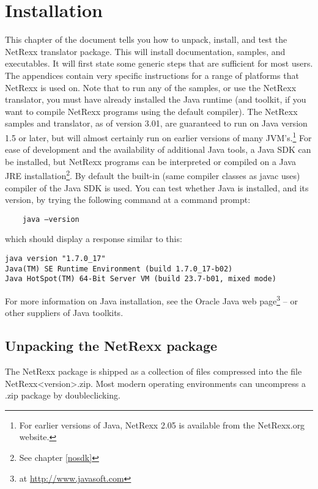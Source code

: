 \chapter{Installation}
This chapter of the document tells you how to unpack, install, and test the NetRexx translator package. This will install documentation, samples, and executables. It will first state some generic steps that are sufficient for most users. The appendices contain very specific instructions for a range of platforms that NetRexx is used on. 
Note that to run any of the samples, or use the NetRexx translator, you must have already installed the Java runtime (and toolkit, if you want to compile NetRexx programs using the default compiler). 
The NetRexx samples and translator, as of version 3.01, are
guaranteed to run on Java version 1.5 or later, but will almost
certainly run on earlier versions of many JVM's.\footnote{For earlier versions of Java,
  NetRexx 2.05 is available from the NetRexx.org website.} For ease
of development and the availability of additional Java tools, a Java
SDK can be installed, but NetRexx
programs can be interpreted or compiled on a Java JRE
installation\footnote{See chapter \ref{nosdk}}. By
default the built-in (same compiler classes as javac uses) compiler of the Java SDK is used. You can test whether Java is installed, and its version, by trying the following command at a command prompt:
\begin{verbatim} 
    java –version
\end{verbatim}
which should display a response similar to this:
\begin{verbatim} 
java version "1.7.0_17"
Java(TM) SE Runtime Environment (build 1.7.0_17-b02)
Java HotSpot(TM) 64-Bit Server VM (build 23.7-b01, mixed mode)
\end{verbatim}
For more information on Java installation, see the Oracle Java web page\footnote{at \url{http://www.javasoft.com}} – or other suppliers of Java toolkits.

\section{Unpacking the NetRexx package}
The NetRexx package is shipped as a collection of files compressed into the file NetRexx<version>.zip. 
Most modern operating environments can uncompress a .zip package by doubleclicking.
